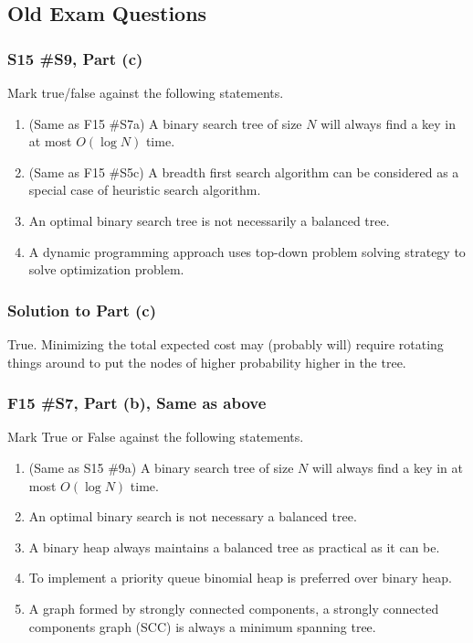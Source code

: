 \subsection{Old Exam Questions}
\subsubsection{S15 \#S9, Part (c)}

	Mark true/false against the following statements. 
	\begin{enumerate}[label=\alph*.]
		\item (Same as F15 \#S7a) A binary search tree of size $N$ will always find a key in at most $O(\log N)$ time.
		\item (Same as F15 \#S5c) A breadth first search algorithm can be considered as a special case of heuristic search algorithm.
		\item An optimal binary search tree is not necessarily a balanced tree.
		\item A dynamic programming approach uses top-down problem solving strategy to solve optimization problem.
	\end{enumerate}

\subsubsection{Solution to Part (c)}

True.  Minimizing the total expected cost may (probably will) require rotating things around to put the nodes of higher probability higher in the tree.  

\subsubsection{F15 \#S7, Part (b), Same as above}
	Mark True or False against the following statements.
	\begin{enumerate}[label=\alph*.]
		\item  (Same as S15 \#9a) A binary search tree of size $N$ will always find a key in at most $O(\log N)$ time.
		\item An optimal binary search is not necessary a balanced tree.
		\item A binary heap always maintains a balanced tree as practical as it can be.
		\item To implement a priority queue binomial heap is preferred over binary heap.
		\item A graph formed by strongly connected components, a strongly connected components graph (SCC) is always a minimum spanning tree.  
	\end{enumerate}
	
